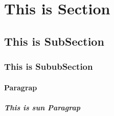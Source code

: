 \documentclass{article}
\begin{document}
\section{This is Section}
\subsection{This is SubSection}
\subsubsection{This is SububSection}
\paragraph{Paragrap}
\subparagraph{This is sun Paragrap}

 
\end{document}
